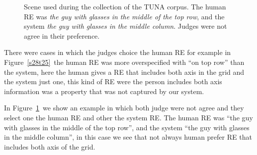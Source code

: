 \begin{figure}[ht]
\begin{minipage}{0.50\linewidth}
\caption{Scene used during the collection of the TUNA corpus. The human RE was \emph{the guy with glasses in the middle of the top row}, and the system \emph{the guy with glasses in the middle column}. Judges were not agree in their preference.}
\label{s307t21}
\end{minipage}
\end{figure}

There were cases in which the judges choice the human RE for example in Figure~\ref{s28t25}~the human RE was more overspecified with ``on top row'' than the system, here the human gives a RE that includes both axis in the grid and the system just one, this kind of RE were the person includes both axis information was a property that was not captured by our system.

In Figure~\ref{s307t21}~we show an example in which both judge were not agree and they select one the human RE and other the system RE.  The human RE was ``the guy with glasses in the middle of the top row'', and the system ``the guy with glasses in the middle column'', in this case we see that not always human prefer RE that includes both axis of the grid.

